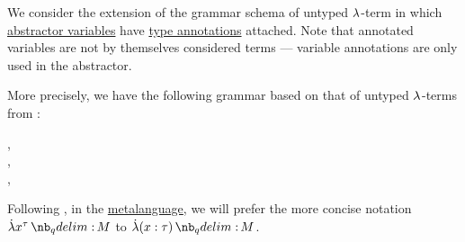 \begin{definition}\label{def:typed_lambda_term}\mimprovised
  We consider the extension of the grammar schema of untyped \( {\mathrm \lambda} \)-term in which \hyperref[def:lambda_abstractor]{abstractor variables} have \hyperref[con:type_annotation]{type annotations} attached. Note that annotated variables are not by themselves considered terms --- variable annotations are only used in the abstractor.

  More precisely, we have the following grammar based on that of untyped \( {\mathrm \lambda} \)-terms from :
  \begin{bnf*}
     { \bnfsp \bnftsq{:} \bnfsp {}}, \\
      {\bnftsq{\( ( \)} \bnfsp {} \bnfsp {} \bnfsp \bnftsq{\( ) \)}}, \\
      {\bnftsq{\( ( \)} \bnfsp \bnftsq{\( \synlambda \)} \bnfsp {} \bnfsp {} \bnfsp {} \bnfsp \bnftsq{\( ) \)}}, \\
             { \bnfor {} \bnfor {}}
  \end{bnf*}

  Following , in the \hyperref[con:metalanguage]{metalanguage}, we will prefer the more concise notation \( \qabs {x^\tau} M \) to \( \qabs {(x: \tau)} M \).
\end{definition}
